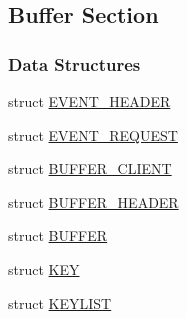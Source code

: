 \subsection{Buffer Section}
\label{group__mbufferh}
\subsubsection*{Data Structures}
\begin{DoxyCompactItemize}
\item 
struct \hyperlink{structEVENT__HEADER}{EVENT\_\-HEADER}
\item 
struct \hyperlink{structEVENT__REQUEST}{EVENT\_\-REQUEST}
\item 
struct \hyperlink{structBUFFER__CLIENT}{BUFFER\_\-CLIENT}
\item 
struct \hyperlink{structBUFFER__HEADER}{BUFFER\_\-HEADER}
\item 
struct \hyperlink{structBUFFER}{BUFFER}
\item 
struct \hyperlink{structKEY}{KEY}
\item 
struct \hyperlink{structKEYLIST}{KEYLIST}
\end{DoxyCompactItemize}
